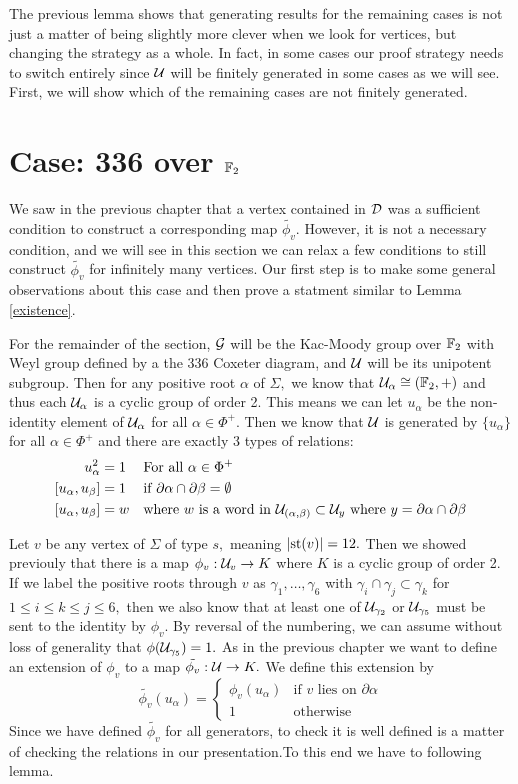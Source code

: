 \documentclass[class=book, crop=false]{standalone}
\begin{document}
The previous lemma shows that generating results for the remaining cases is not just a matter of being slightly more clever when we look for vertices, but changing the strategy as a whole. In fact, in some cases our proof strategy needs to switch entirely since $\mathcal{U}$ will be finitely generated in some cases as we will see. First, we will show which of the remaining cases are not finitely generated.

\section{Case: 336 over $\mathbb{F}_{2}$}
We saw in the previous chapter that a vertex contained in $\mathcal{D}$ was a sufficient condition to construct a corresponding map $\tilde{\phi_v}.$ However, it is not a necessary condition, and we will see in this section we can relax a few conditions to still construct $\tilde{\phi_v}$ for infinitely many vertices. Our first step is to make some general observations about this case and then prove a statment similar to Lemma \ref{existence}.

For the remainder of the section, $\mathcal{G}$ will be the Kac-Moody group over $\mathbb{F}_{2}$ with Weyl group defined by a the 336 Coxeter diagram, and $\mathcal{U}$ will be its unipotent subgroup. Then for any positive root $\alpha$ of $\Sigma,$ we know that $\mathcal{U}_\alpha\cong (\mathbb{F}_{2},+)$ and thus each $\mathcal{U}_\alpha$ is a cyclic group of order 2. This means we can let $u_\alpha$ be the non-identity element of $\mathcal{U}_\alpha$ for all $\alpha\in \Phi^+.$ Then we know that $\mathcal{U}$ is generated by $\{u_\alpha\}$ for all $\alpha\in \Phi^+$ and there are exactly 3 types of relations:
\begin{align*}
	u_\alpha^2&=1&&\text{For all }\alpha\in \Phi^+\\
[u_\alpha,u_\beta]&=1&&\text{if }\partial\alpha\cap \partial\beta=\emptyset\\
[u_\alpha,u_\beta]&=w&&\text{where }w\text{ is a word in }\mathcal{U}_{(\alpha,\beta)}\subset \mathcal{U}_y\text{ where }y=\partial\alpha\cap \partial\beta
\end{align*}

Let $v$ be any vertex of $\Sigma$ of type $s,$ meaning $|\mathrm{st}(v)|=12.$ Then we showed previouly that there is a map $\phi_v:\mathcal{U}_v\to K$ where $K$ is a cyclic group of order 2. If we label the positive roots through $v$ as  $\gamma_1,\dots,\gamma_6$ with $\gamma_i\cap \gamma_j\subset \gamma_k$ for $1\le i\le k\le j\le 6,$ then we also know that at least one of $\mathcal{U}_{\gamma_2}$ or $\mathcal{U}_{\gamma_5}$ must be sent to the identity by $\phi_v.$ By reversal of the numbering, we can assume without loss of generality that $\phi(\mathcal{U}_{\gamma_5})=1.$ As in the previous chapter we want to define an extension of $\phi_v$ to a map $\tilde{\phi_v}:\mathcal{U}\to K.$ We define this extension by
\[
	\tilde{\phi_v}(u_\alpha)=\begin{cases}\phi_v(u_\alpha)&\text{if }v\text{ lies on }\partial\alpha\\1&\text{otherwise}
	\end{cases}
	\]
Since we have defined $\tilde{\phi_v}$ for all generators, to check it is well defined is a matter of checking the relations in our presentation.To this end we have to following lemma.
\end{document}
